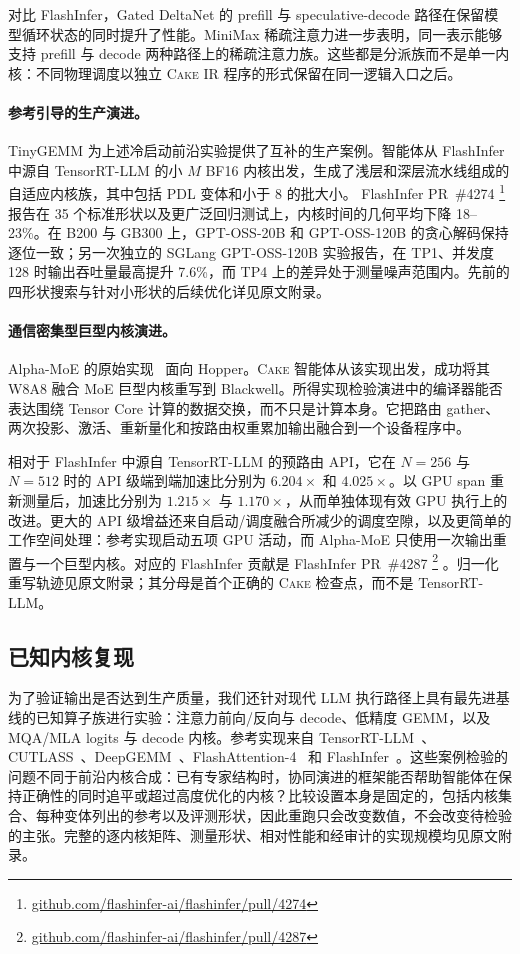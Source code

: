 \documentclass[10pt]{article}
\newcommand{\cake}{\textsc{Cake}}
\newcommand{\cakeir}{\textsc{Cake IR}}
\newcommand{\flashinferpr}[1]{%
  FlashInfer PR~\##1%
  \footnote{\href{https://github.com/flashinfer-ai/flashinfer/pull/#1}%
    {github.com/flashinfer-ai/flashinfer/pull/#1}}%
}
\begin{document}
对比 FlashInfer，Gated DeltaNet 的 prefill 与 speculative-decode 路径在保留模型循环状态的同时提升了性能。MiniMax 稀疏注意力进一步表明，同一表示能够支持 prefill 与 decode 两种路径上的稀疏注意力族。这些都是分派族而不是单一内核：不同物理调度以独立 \cakeir{} 程序的形式保留在同一逻辑入口之后。

\paragraph{参考引导的生产演进。}
TinyGEMM 为上述冷启动前沿实验提供了互补的生产案例。智能体从 FlashInfer 中源自 TensorRT-LLM 的小 $M$ BF16 内核出发，生成了浅层和深层流水线组成的自适应内核族，其中包括 PDL 变体和小于 8 的批大小。\flashinferpr{4274} 报告在 35 个标准形状以及更广泛回归测试上，内核时间的几何平均下降 18--23\%。在 B200 与 GB300 上，GPT-OSS-20B 和 GPT-OSS-120B 的贪心解码保持逐位一致；另一次独立的 SGLang GPT-OSS-120B 实验报告，在 TP1、并发度 128 时输出吞吐量最高提升 7.6\%，而 TP4 上的差异处于测量噪声范围内。先前的四形状搜索与针对小形状的后续优化详见原文附录。

\paragraph{通信密集型巨型内核演进。}
Alpha-MoE 的原始实现~\cite{alpha_moe2025} 面向 Hopper。\cake{} 智能体从该实现出发，成功将其 W8A8 融合 MoE 巨型内核重写到 Blackwell。所得实现检验演进中的编译器能否表达围绕 Tensor Core 计算的数据交换，而不只是计算本身。它把路由 gather、两次投影、激活、重新量化和按路由权重累加输出融合到一个设备程序中。

相对于 FlashInfer 中源自 TensorRT-LLM 的预路由 API，它在 $N{=}256$ 与 $N{=}512$ 时的 API 级端到端加速比分别为 $6.204\times$ 和 $4.025\times$。以 GPU span 重新测量后，加速比分别为 $1.215\times$ 与 $1.170\times$，从而单独体现有效 GPU 执行上的改进。更大的 API 级增益还来自启动/调度融合所减少的调度空隙，以及更简单的工作空间处理：参考实现启动五项 GPU 活动，而 Alpha-MoE 只使用一次输出重置与一个巨型内核。对应的 FlashInfer 贡献是 \flashinferpr{4287}。归一化重写轨迹见原文附录；其分母是首个正确的 \cake{} 检查点，而不是 TensorRT-LLM。

\FloatBarrier
\subsection{已知内核复现}
\label{sec:eval-known}

为了验证输出是否达到生产质量，我们还针对现代 LLM 执行路径上具有最先进基线的已知算子族进行实验：注意力前向/反向与 decode、低精度 GEMM，以及 MQA/MLA logits 与 decode 内核。参考实现来自 TensorRT-LLM~\cite{tensorrtllm}、CUTLASS~\cite{cutlass}、DeepGEMM~\cite{deepgemm2025}、FlashAttention-4~\cite{zadouri2026flashattention4algorithmkernelpipelining} 和 FlashInfer~\cite{flashinfer}。这些案例检验的问题不同于前沿内核合成：已有专家结构时，协同演进的框架能否帮助智能体在保持正确性的同时追平或超过高度优化的内核？比较设置本身是固定的，包括内核集合、每种变体列出的参考以及评测形状，因此重跑只会改变数值，不会改变待检验的主张。完整的逐内核矩阵、测量形状、相对性能和经审计的实现规模均见原文附录。
\end{document}
